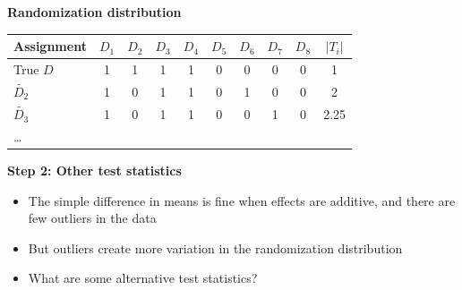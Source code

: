 \documentclass[notes=show]{beamer}
\begin{document}
\begin{frame}[plain]
\begin{center}
\textbf{Randomization distribution}
\end{center}

\begin{table}[htbp]\centering
\begin{center}
\begin{threeparttable}
\begin{tabular}{lccccccccc}
\toprule
\multicolumn{1}{l}{Assignment}&
\multicolumn{1}{c}{$D_1$}&
\multicolumn{1}{c}{$D_2$}&
\multicolumn{1}{c}{$D_3$}&
\multicolumn{1}{c}{$D_4$}&
\multicolumn{1}{c}{$D_5$}&
\multicolumn{1}{c}{$D_6$}&
\multicolumn{1}{c}{$D_7$}&
\multicolumn{1}{c}{$D_8$}&
\multicolumn{1}{c}{$|T_i|$}\\
\midrule
True $D$ & 1 & 1 & 1 & 1 & 0 & 0 & 0 & 0 & 1 \\
$\tilde{D_2}$ & 1 & 0 & 1 & 1 & 0 & 1 & 0 & 0 & 2 \\
$\tilde{D_3}$ & 1 & 0 & 1 & 1 & 0 & 0 & 1 & 0 & 2.25 \\
\dots \\
\bottomrule
\end{tabular}
\end{threeparttable}
\end{center}
\end{table}

\end{frame}


\begin{frame}[plain]
\begin{center}
\textbf{Step 2: Other test statistics}
\end{center}

\begin{itemize}
\item The simple difference in means is fine when effects are additive, and there are few outliers in the data
\item But outliers create more variation in the randomization distribution
\item What are some alternative test statistics?
\end{itemize}

\end{frame}
\end{document}
